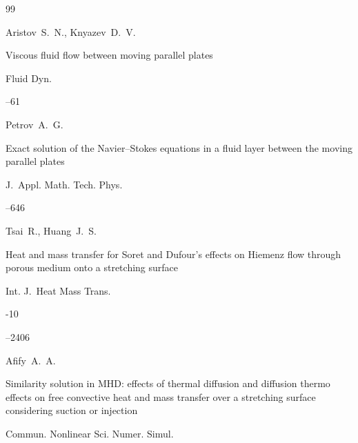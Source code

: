 \begin{thebibliography}{99}

\by Aristov~S.~N., Knyazev~D.~V.

\paper Viscous fluid flow between moving parallel plates

\jour Fluid Dyn.




--61 






\by Petrov~A.~G.

\paper Exact solution of the Navier--Stokes equations in a fluid layer between the moving parallel plates

\jour J.~Appl. Math. Tech. Phys.




--646






\by Tsai~R., Huang~J.~S.

\paper Heat and mass transfer for Soret and Dufour’s effects on Hiemenz flow through porous medium onto a stretching surface

\jour Int.  J.~Heat Mass Trans. 



-10

--2406






\by Afify~A.~A.

\paper Similarity solution in MHD: effects of thermal diffusion and diffusion thermo effects on free convective heat and mass transfer over a stretching surface considering suction or injection

\jour Commun. Nonlinear Sci.  Numer.  Simul. 


\end{thebibliography}
